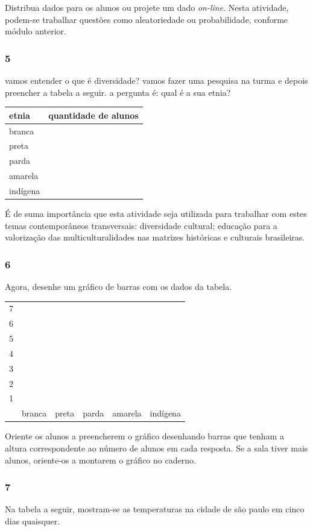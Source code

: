 Distribua dados para os alunos ou projete um dado
\textit{on-line}. Nesta atividade, podem-se trabalhar questões como
aleatoriedade ou probabilidade, conforme módulo anterior.

\subsubsection{5}\label{section-80}

vamos entender o que é diversidade? vamos fazer uma pesquisa na turma e
depois preencher a tabela a seguir. a pergunta é: qual é a sua etnia?

\begin{longtable}[]{@{}ll@{}}
\toprule
etnia & quantidade de alunos\tabularnewline
\midrule
\endhead
branca &\tabularnewline
preta &\tabularnewline
parda &\tabularnewline
amarela &\tabularnewline
indígena &\tabularnewline
\bottomrule
\end{longtable}

É de suma importância que esta atividade seja utilizada para trabalhar com estes temas contemporâneos transversais: diversidade cultural; educação para a valorização das
multiculturalidades nas matrizes históricas e culturais brasileiras.

\subsubsection{6}\label{section-81}

Agora, desenhe um gráfico de barras com os dados da tabela.

\begin{longtable}[]{@{}llllll@{}}
\toprule
7 & & & & &\tabularnewline
6 & & & & &\tabularnewline
5 & & & & &\tabularnewline
4 & & & & &\tabularnewline
3 & & & & &\tabularnewline
2 & & & & &\tabularnewline
1 & & & & &\tabularnewline
& branca & preta & parda & amarela & indígena\tabularnewline
\bottomrule
\end{longtable}

Oriente os alunos a preencherem o gráfico desenhando
barras que tenham a altura correspondente ao número de alunos em cada resposta.
Se a sala tiver mais alunos, oriente-os a montarem o gráfico no caderno.

\subsubsection{7}\label{section-82}

Na tabela a seguir, mostram-se as temperaturas na cidade de são paulo em cinco
dias quaisquer.

